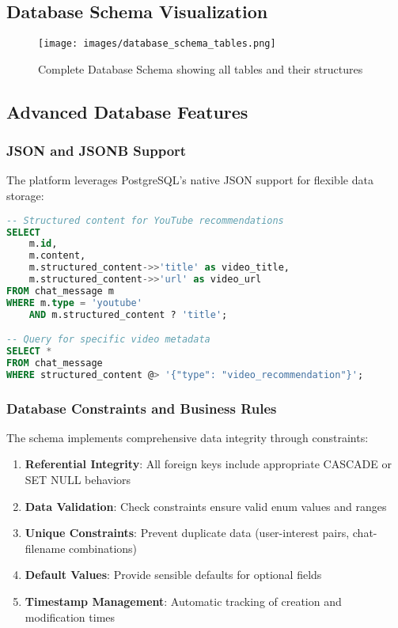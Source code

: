\documentclass[12pt,a4paper]{article}
\begin{document}
\subsection{Database Schema Visualization}

\begin{figure}[h]
    \centering
    \texttt{[image: images/database\_schema\_tables.png]}
    \caption{Complete Database Schema showing all tables and their structures}
    \label{fig:database_schema}
\end{figure}

\subsection{Advanced Database Features}

\subsubsection{JSON and JSONB Support}

The platform leverages PostgreSQL's native JSON support for flexible data storage:

\begin{lstlisting}[language=SQL, caption=JSON Field Usage Examples]
-- Structured content for YouTube recommendations
SELECT 
    m.id,
    m.content,
    m.structured_content->>'title' as video_title,
    m.structured_content->>'url' as video_url
FROM chat_message m 
WHERE m.type = 'youtube' 
    AND m.structured_content ? 'title';

-- Query for specific video metadata
SELECT *
FROM chat_message 
WHERE structured_content @> '{"type": "video_recommendation"}';
\end{lstlisting}

\subsubsection{Database Constraints and Business Rules}

The schema implements comprehensive data integrity through constraints:

\begin{enumerate}
    \item \textbf{Referential Integrity}: All foreign keys include appropriate CASCADE or SET NULL behaviors
    \item \textbf{Data Validation}: Check constraints ensure valid enum values and ranges
    \item \textbf{Unique Constraints}: Prevent duplicate data (user-interest pairs, chat-filename combinations)
    \item \textbf{Default Values}: Provide sensible defaults for optional fields
    \item \textbf{Timestamp Management}: Automatic tracking of creation and modification times
\end{enumerate}
\end{document}
